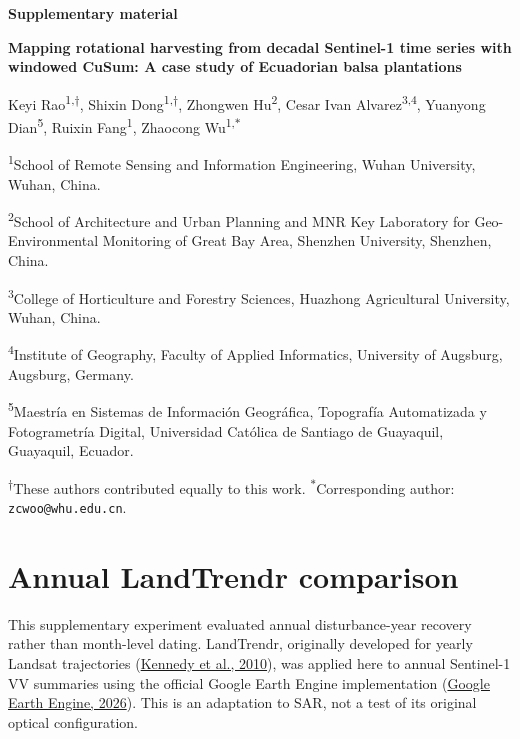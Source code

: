 \documentclass[11pt,a4paper]{article}
\begin{document}
\begin{center}
{\Large\bfseries Supplementary material\par}
\vspace{6pt}
{\large\bfseries Mapping rotational harvesting from decadal Sentinel-1 time series with windowed CuSum: A case study of Ecuadorian balsa plantations\par}
\vspace{8pt}
Keyi Rao\textsuperscript{1,$\dagger$}, Shixin Dong\textsuperscript{1,$\dagger$}, Zhongwen Hu\textsuperscript{2},
Cesar Ivan Alvarez\textsuperscript{3,4}, Yuanyong Dian\textsuperscript{5}, Ruixin Fang\textsuperscript{1}, Zhaocong Wu\textsuperscript{1,$\ast$}
\end{center}
{\small
\textsuperscript{1}School of Remote Sensing and Information Engineering, Wuhan University, Wuhan, China.\par
\textsuperscript{2}School of Architecture and Urban Planning and MNR Key Laboratory for Geo-Environmental Monitoring of Great Bay Area, Shenzhen University, Shenzhen, China.\par
\textsuperscript{3}College of Horticulture and Forestry Sciences, Huazhong Agricultural University, Wuhan, China.\par
\textsuperscript{4}Institute of Geography, Faculty of Applied Informatics, University of Augsburg, Augsburg, Germany.\par
\textsuperscript{5}Maestr\'ia en Sistemas de Informaci\'on Geogr\'afica, Topograf\'ia Automatizada y Fotogrametr\'ia Digital, Universidad Cat\'olica de Santiago de Guayaquil, Guayaquil, Ecuador.\par
\textsuperscript{$\dagger$}These authors contributed equally to this work. \textsuperscript{$\ast$}Corresponding author: \texttt{zcwoo@whu.edu.cn}.\par
}

\section{Annual LandTrendr comparison}
\label{sec:si_annual_protocol}
This supplementary experiment evaluated annual disturbance-year recovery rather than month-level dating. LandTrendr, originally developed for yearly Landsat trajectories (\hyperref[ref:kennedy]{Kennedy et al., 2010}), was applied here to annual Sentinel-1 VV summaries using the official Google Earth Engine implementation (\hyperref[ref:gee]{Google Earth Engine, 2026}). This is an adaptation to SAR, not a test of its original optical configuration.
\end{document}
